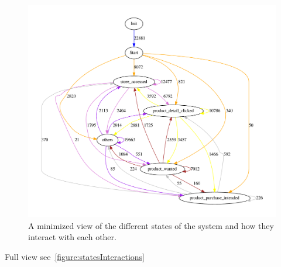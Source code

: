     \begin{figure}[H]
        \includegraphics[width=5in]{image/statesInteractionTrue-gvfile.pdf}
        \centering
        \caption{A minimized view of the different states of the system and how they interact with each other.}
        \label{figure:minStatesInteractions}
    \end{figure}

    Full view see~\ref{figure:statesInteractions}

